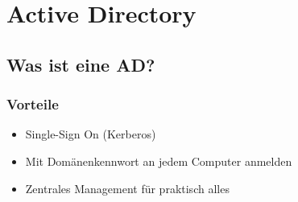 


\section{Active Directory}\label{sec:active-directory}

\subsection{Was ist eine AD?}\label{subsec:was-ist-eine-ad}

\subsubsection{Vorteile}
\begin{itemize}
    \item Single-Sign On (Kerberos)
    \item Mit Domänenkennwort an jedem Computer anmelden
    \item Zentrales Management für praktisch alles
\end{itemize}

